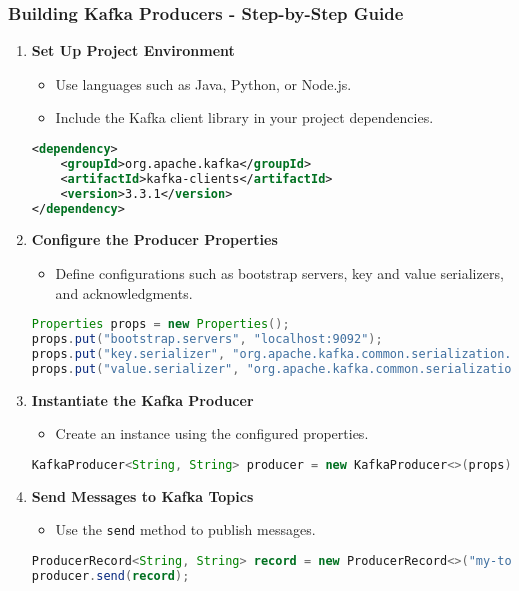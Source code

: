 \documentclass[aspectratio=169]{beamer}
\begin{document}
\begin{frame}[fragile]
    \frametitle{Building Kafka Producers - Step-by-Step Guide}
    \begin{enumerate}
        \item \textbf{Set Up Project Environment}
        \begin{itemize}
            \item Use languages such as Java, Python, or Node.js.
            \item Include the Kafka client library in your project dependencies.
        \end{itemize}
        \begin{lstlisting}[language=xml]
<dependency>
    <groupId>org.apache.kafka</groupId>
    <artifactId>kafka-clients</artifactId>
    <version>3.3.1</version>
</dependency>
        \end{lstlisting}
        
        \item \textbf{Configure the Producer Properties}
        \begin{itemize}
            \item Define configurations such as bootstrap servers, key and value serializers, and acknowledgments.
        \end{itemize}
        \begin{lstlisting}[language=java]
Properties props = new Properties();
props.put("bootstrap.servers", "localhost:9092");
props.put("key.serializer", "org.apache.kafka.common.serialization.StringSerializer");
props.put("value.serializer", "org.apache.kafka.common.serialization.StringSerializer");
        \end{lstlisting}
        
        \item \textbf{Instantiate the Kafka Producer}
        \begin{itemize}
            \item Create an instance using the configured properties.
        \end{itemize}
        \begin{lstlisting}[language=java]
KafkaProducer<String, String> producer = new KafkaProducer<>(props);
        \end{lstlisting}
        
        \item \textbf{Send Messages to Kafka Topics}
        \begin{itemize}
            \item Use the \texttt{send} method to publish messages.
        \end{itemize}
        \begin{lstlisting}[language=java]
ProducerRecord<String, String> record = new ProducerRecord<>("my-topic", "key", "value");
producer.send(record);
        \end{lstlisting}
        

\end{enumerate}
\end{frame}
\end{document}

